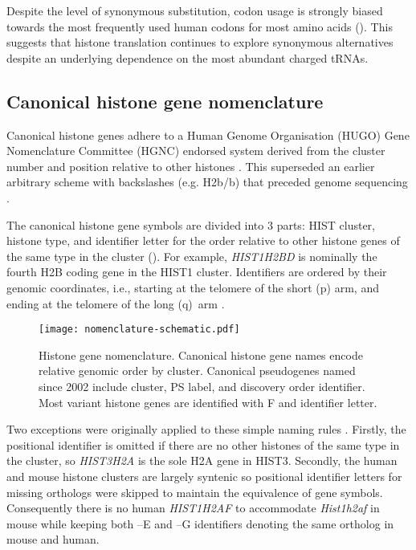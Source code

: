     Despite the level of synonymous substitution,
    codon usage is strongly biased towards the most frequently used
    human codons for most amino acids ().
    This suggests that histone translation continues to explore synonymous alternatives
    despite an underlying dependence on the most abundant charged tRNAs.

  \subsection{Canonical histone gene nomenclature}
    Canonical histone genes adhere to a Human Genome Organisation (HUGO)
    Gene Nomenclature Committee (HGNC)
    endorsed system derived from the cluster number and position relative
    to other histones \citep{Marzluff02}.
    This superseded an earlier arbitrary scheme with backslashes (e.g. H2b/b)
    that preceded genome sequencing \citep{AlbigGenomics1997,AlbigHumangen1997}.

    The canonical histone gene symbols are divided into 3 parts:
    HIST cluster, histone type, and identifier letter
    for the order relative to other histone genes of the same type in
    the cluster ().
    For example, \textit{HIST1H2BD} is nominally the fourth H2B coding gene in the HIST1 cluster.
    Identifiers are ordered by their genomic coordinates, i.e., starting at
    the telomere of the short (p) arm, and ending at the telomere of the
    long (q)~arm \citep{Marzluff02}.

    \begin{figure*}
      \centering
      \texttt{[image: nomenclature-schematic.pdf]}
      \caption{Histone gene nomenclature.
               Canonical histone gene names encode relative genomic order by cluster.
               Canonical pseudogenes named since 2002 include cluster,
               PS label, and discovery order identifier.
               Most variant histone genes are identified with F and identifier letter.}
      \label{fig:nomenclature}
    \end{figure*}

    Two exceptions were originally applied to these simple naming rules \citep{Marzluff02}.
    Firstly, the positional identifier is omitted if there are no
    other histones of the same type in the cluster,
    so \textit{HIST3H2A} is the sole H2A gene in HIST3.
    Secondly, the human and mouse histone clusters are largely syntenic
    so positional identifier letters for missing orthologs were skipped
    to maintain the equivalence of gene symbols.
    Consequently there is no human \textit{HIST1H2AF} to accommodate
    \textit{Hist1h2af} in mouse while keeping both --E and --G identifiers
    denoting the same ortholog in mouse and human.

